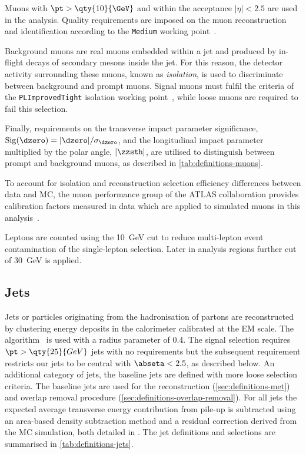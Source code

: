Muons with \(\pt > \qty{10}{\GeV}\) and within the acceptance \(|\eta| < 2.5\)
are used in the analysis. Quality requirements are imposed on the muon
reconstruction and identification according to the \texttt{Medium} working point~\cite{PERF-2015-10}.

Background muons are real muons embedded within a jet and produced by in-flight
decays of secondary mesons inside the jet. For this reason, the detector
activity surrounding these muons, known as \textit{isolation}, is used
to discriminate between background and prompt muons.
Signal muons must fulfil the criteria of the \texttt{PLImprovedTight} isolation working 
point~\cite{web:PLImprovedWPs},
while loose muons are required to fail this selection.

Finally, requirements on the transverse impact parameter significance,
\( \mathrm{Sig}(\dzero)=|\dzero|/\sigma_{\dzero} \),
and the longitudinal impact parameter multiplied by the polar angle,
\( |\zzsth| \), are utilised to distinguish between prompt and background muons,
as described in \cref{tab:definitions-muons}.

To account for isolation and reconstruction selection efficiency differences
between data and MC, the muon performance group of the ATLAS collaboration
provides calibration factors measured in data which are applied to simulated
muons in this analysis~\cite{web:MuonRecommendations}.

Leptons are counted using the \qty{10}{\GeV} cut to reduce multi-lepton event
contamination of the single-lepton selection. Later in analysis regions
further cut of \qty{30}{\GeV} is applied.


\subsection{Jets}%
\label{sec:definitions-jets}

Jets or particles originating from the hadronisation of partons are
reconstructed by clustering energy deposits in the calorimeter calibrated at
the EM scale. The \antikt algorithm~\cite{Cacciari:2008gp} is used with
a radius parameter of 0.4. The signal selection requires 
\(\pt > \qty{25}{GeV}\) jets with no \eta requirements but the subsequent \bjet
requirement restricts our jets to be central with \(\abseta < 2.5\),
as described below.
An additional category of jets, the baseline jets are defined with more loose
selection criteria. The baseline jets are used for the \met reconstruction (\cref{sec:definitions-met}) and
overlap removal procedure (\cref{sec:definitions-overlap-removal}).
For all jets the expected average transverse energy
contribution from pile-up is subtracted using an area-based \pt density
subtraction method and a residual correction derived from the MC simulation,
both detailed in .
The jet definitions and selections are summarised in \cref{tab:definitions-jets}.

